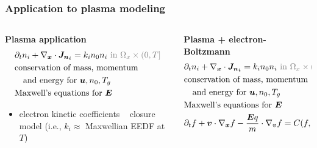 \documentclass[mathserif, aspectratio=169]{beamer}
\newcommand{\vect}[1]{\boldsymbol{#1}}
\begin{document}
\begin{frame}
	\frametitle{Application to plasma modeling}
		\begin{columns}
		\begin{column}{0.48\textwidth}
			\textbf{Plasma application}
			\footnotesize
			\begin{align*}
				&\partial_t n_i + \nabla_{\vect{x}} \cdot \vect{J_{n_i}}  = k_i n_0 n_i  \color{gray}{\text{ in } \Omega_x \times (0,T]}\\
				&\text{conservation of mass, momentum} \\
				&\quad  \text{and energy for } \vect{u}, n_0, T_g \\
				&\text{Maxwell's equations for } \vect{E}
			\end{align*}
			\begin{itemize}
				\item electron kinetic coefficients ~ closure model (i.e., $k_i \approx$ Maxwellian EEDF at $T$)
			\end{itemize}
		\end{column}
		\begin{column}{0.48\textwidth}
			\textbf{Plasma + electron-Boltzmann}
			\footnotesize
			\begin{align*}
				&\partial_t n_i + \nabla_{\vect{x}} \cdot \vect{J_{n_i}}  = k_i n_0 n_i  \color{gray}{\text{ in } \Omega_x \times (0,T]}\\
				&\text{conservation of mass, momentum} \\
				&\quad  \text{and energy for } \vect{u}, n_0, T_g \\
				&\text{Maxwell's equations for } \vect{E}\\
				&\partial_t f  + \vect{v} \cdot \nabla_{\vect{x}} f -\frac{\vect{E} q}{m} \cdot \nabla_{\vect{v }}f = C(f, n_0, n_i, T_g) \color{gray}{\text{ in } \Omega_x \times \Omega_v \times (0,T]}

\end{align*}
\end{column}
\end{columns}
\end{frame}
\end{document}
